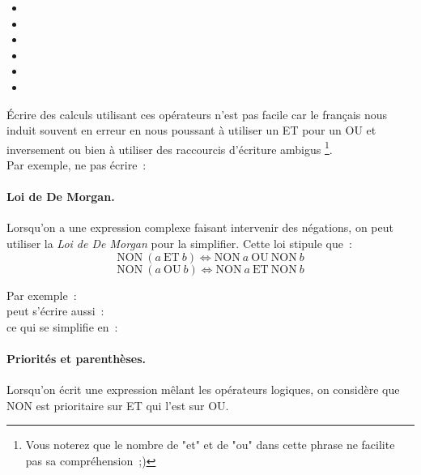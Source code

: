 			\begin{small}
			\begin{multicols}{2}
				\begin{itemize}
					\item {}
					\item {}
					\item {}
					\item {}
					\item {}
					\item {}
				\end{itemize}
			\end{multicols}
			\end{small}
	
			Écrire des calculs utilisant ces opérateurs n’est pas facile
			car le français nous induit souvent en erreur
			en nous poussant à utiliser un ET pour un OU et inversement
			ou bien à utiliser des raccourcis d’écriture ambigus%
			\footnote{%
				Vous noterez que le nombre de "et" et de "ou"
				dans cette phrase ne facilite pas sa compréhension~;)%
			}. 
			\\Par exemple, ne pas écrire~: 
	
			\paragraph{Loi de De Morgan.}
				Lorsqu’on a une expression complexe faisant intervenir
				des négations, on peut utiliser la \emph{Loi de De Morgan}
				pour la simplifier.
				Cette loi stipule que~:
				\[
					\mathrm{NON}\ (a\ \mathrm{ET}\ b) \Leftrightarrow \mathrm{NON}\ a\ \mathrm{OU}\ \mathrm{NON}\ b
				\]
				\[
					\mathrm{NON}\ (a\ \mathrm{OU}\ b) \Leftrightarrow \mathrm{NON}\ a\ \mathrm{ET}\ \mathrm{NON}\ b
				\]
				
				Par exemple~: 
				\\peut s’écrire aussi~: 
				\\ce qui se simplifie en~: 
	
			\paragraph{Priorités et parenthèses.}
				Lorsqu’on écrit une expression mêlant les opérateurs logiques,
				on considère que NON est prioritaire sur ET qui l’est sur OU.
				
